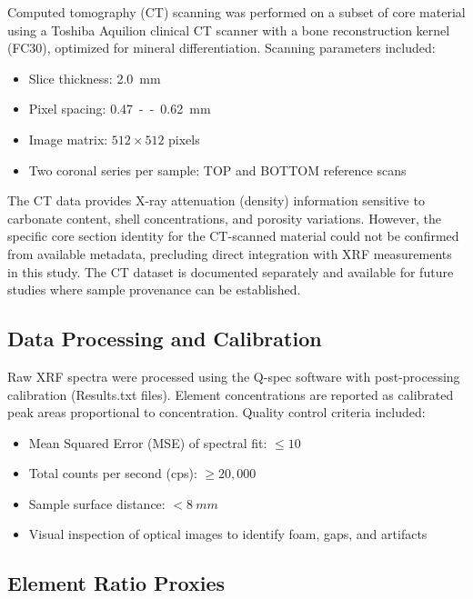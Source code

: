 \documentclass[11pt,a4paper]{article}
\begin{document}
Computed tomography (CT) scanning was performed on a subset of core material using a Toshiba Aquilion clinical CT scanner with a bone reconstruction kernel (FC30), optimized for mineral differentiation. Scanning parameters included:

\begin{itemize}
    \item Slice thickness: \SI{2.0}{mm}
    \item Pixel spacing: \SI{0.47}--\SI{0.62}{mm}
    \item Image matrix: $512 \times 512$ pixels
    \item Two coronal series per sample: TOP and BOTTOM reference scans
\end{itemize}

The CT data provides X-ray attenuation (density) information sensitive to carbonate content, shell concentrations, and porosity variations. However, the specific core section identity for the CT-scanned material could not be confirmed from available metadata, precluding direct integration with XRF measurements in this study. The CT dataset is documented separately and available for future studies where sample provenance can be established.

\subsection{Data Processing and Calibration}

Raw XRF spectra were processed using the Q-spec software with post-processing calibration (Results.txt files). Element concentrations are reported as calibrated peak areas proportional to concentration. Quality control criteria included:

\begin{itemize}
    \item Mean Squared Error (MSE) of spectral fit: $\leq 10$
    \item Total counts per second (cps): $\geq 20,000$
    \item Sample surface distance: $< \SI{8}{mm}$
    \item Visual inspection of optical images to identify foam, gaps, and artifacts
\end{itemize}

\subsection{Element Ratio Proxies}
\end{document}
